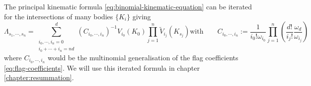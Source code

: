 The principal kinematic formula \eqref{eq:binomial-kinematic-equation} can be iterated for the intersections of many bodies $\{K_i\}$ giving \cite{Santalo2004,MarechalPRE2014}
\begin{subequations}\label{eq:multinomial-kinematic-equation}
  \begin{equation}
    \Lambda_{s_1, \cdots, s_n}
    =
      \sum_{\substack{i_0, \cdots, i_n = 0 \\ i_0 + \cdots + i_n = nd}}^d
      (C_{i_0, \cdots, i_n})^{-1}
      V_{i_0}(K_0)
      \prod_{j=1}^n
      \widetilde{V}_{i_j}(K_{s_j})
  \end{equation}
  \begin{equation}
    \textrm{with} \qquad
    C_{i_0, \cdots, i_n}
    := \frac{1}{i_0! \omega_{i_0}}
    \prod_{j=1}^n
    \left(
    \frac{d!}{i_j!} \frac{\omega_d}{\omega_{i_j}}
    \right)
  \end{equation}
\end{subequations}
where $C_{i_0, \cdots, i_n}$ would be the multinomial generalisation of the flag coefficients \eqref{eq:flag-coefficients}.
We will use this iterated formula in chapter \ref{chapter:resummation}.


